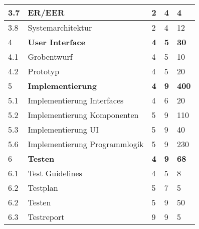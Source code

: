 \begin{tabular}{ | l | p{8cm} | p{2cm}|p{2cm}|p{2cm}|}
\hline
3.7 &ER/EER                            &2 &4 & 4 \\
\hline
3.8 &Systemarchitektur                 &2 &4 & 12 \\
\hline
4 &\textbf{User Interface}                   &\textbf{4} &\textbf{5} & \textbf{30} \\
\hline
4.1 &Grobentwurf                       &4 &5 & 10 \\
\hline
4.2 &Prototyp                          &4 &5 & 20 \\
\hline
5 &\textbf{Implementierung}                 &\textbf{4} &\textbf{9} & \textbf{400} \\
\hline
5.1 &Implementierung Interfaces        &4 &6 & 20 \\
\hline
5.2 &Implementierung Komponenten       &5 &9 & 110 \\
\hline
5.3 &Implementierung UI                &5 &9 & 40 \\
\hline
5.6 &Implementierung Programmlogik     &5 &9 & 230 \\
\hline
6 &\textbf{Testen}                           &\textbf{4} &\textbf{9} & \textbf{68} \\
\hline
6.1 &Test Guidelines                   &4 &5 & 8 \\
\hline
6.2 &Testplan                          &5 &7 & 5 \\
\hline
6.2 &Testen                            &5 &9 & 50 \\
\hline
6.3 &Testreport                        &9 &9 & 5 \\
\hline
\end{tabular}

